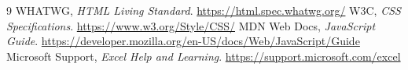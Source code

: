 \documentclass[12pt,a4paper]{report}
\begin{document}
\begin{thebibliography}{9}
 WHATWG, \textit{HTML Living Standard}. \url{https://html.spec.whatwg.org/}
 W3C, \textit{CSS Specifications}. \url{https://www.w3.org/Style/CSS/}
 MDN Web Docs, \textit{JavaScript Guide}. \url{https://developer.mozilla.org/en-US/docs/Web/JavaScript/Guide}
 Microsoft Support, \textit{Excel Help and Learning}. \url{https://support.microsoft.com/excel}
\end{thebibliography}
\end{document}
